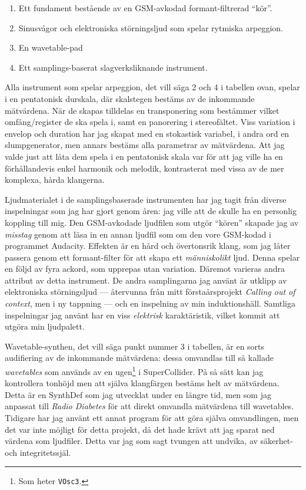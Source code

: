 \documentclass[11pt, a4paper]{article} %
\begin{document}
  \begin{enumerate}
	\item Ett fundament bestående av en GSM-avkodad formant-filtrerad ``kör''.
	\item Sinusvågor och elektroniska störningsljud som spelar rytmiska arpeggion.
	\item En wavetable-pad
	\item Ett samplings-baserat slagverksliknande instrument.
  \end{enumerate}

Alla instrument som spelar arpeggion, det vill säga 2 och 4 i tabellen ovan, spelar i en pentatonisk durskala, där skalstegen bestäms av de inkommande mätvärdena. När de skapas tilldelas en transponering som bestämmer vilket omfång/register de ska spela i, samt en panorering i stereofältet. Viss variation i envelop och duration har jag skapat med en stokastisk variabel, i andra ord en slumpgenerator, men annars bestäms alla parametrar av mätvärdena. Att jag valde just att låta dem spela i en pentatonisk skala var för att jag ville ha en förhållandevis enkel harmonik och melodik, kontrasterat med vissa av de mer komplexa, hårda klangerna. 

Ljudmaterialet i de samplingsbaserade instrumenten har jag tagit från diverse inspelningar som jag har gjort genom åren: jag ville att de skulle ha en personlig koppling till mig. Den GSM-avkodade ljudfilen som utgör ``kören'' skapade jag av \emph{misstag} genom att läsa in en annan ljudfil som om den vore GSM-kodad i programmet Audacity. Effekten är en hård och övertonsrik klang, som jag låter passera genom ett formant-filter för att skapa ett \emph{människolikt} ljud. Denna spelar en följd av fyra ackord, som upprepas utan variation. Däremot varieras andra attribut av detta instrument. De andra samplingarna jag använt är utklipp av elektroniska störningsljud --- återvunna från mitt förstaårsprojekt \emph{Calling out of context}, men i ny tappning --- och en inspelning av min induktionshäll. Samtliga inspelningar jag använt har en viss \emph{elektrisk} karaktäristik, vilket kommit att utgöra min ljudpalett. 

Wavetable-synthen, det vill säga punkt nummer 3 i tabellen, är en sorts audifiering av de inkommande mätvärdena: dessa omvandlas till så kallade \emph{wavetables} som används av en \gls{ugen}\footnote{Som heter \texttt{VOsc3}.} i SuperCollider. På så sätt kan jag kontrollera tonhöjd men att själva klangfärgen bestäms helt av mätvärdena. Detta är en SynthDef som jag utvecklat under en längre tid, men som jag anpassat till \emph{Radio Diabetes} för att direkt omvandla mätvärdena till wavetables. Tidigare har jag använt ett annat program för att göra själva omvandlingen, men det var inte möjligt för detta projekt, då det hade krävt att jag sparat ned värdena som ljudfiler. Detta var jag som sagt tvungen att undvika, av säkerhet- och integritetssjäl.
\end{document}
